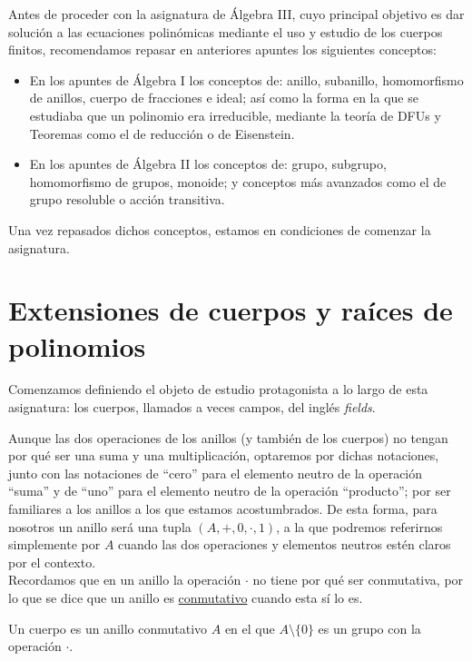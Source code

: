 Antes de proceder con la asignatura de Álgebra III, cuyo principal objetivo es dar solución a las ecuaciones polinómicas mediante el uso y estudio de los cuerpos finitos, recomendamos repasar en anteriores apuntes los siguientes conceptos:
\begin{itemize}
    \item En los apuntes de Álgebra I los conceptos de: anillo, subanillo, homomorfismo de anillos, cuerpo de fracciones e ideal; así como la forma en la que se estudiaba que un polinomio era irreducible, mediante la teoría de DFUs y Teoremas como el de reducción o de Eisenstein.
    \item En los apuntes de Álgebra II los conceptos de: grupo, subgrupo, homomorfismo de grupos, monoide; y conceptos más avanzados como el de grupo resoluble o acción transitiva.
\end{itemize}
Una vez repasados dichos conceptos, estamos en condiciones de comenzar la asignatura.

\chapter{Extensiones de cuerpos y raíces de polinomios}
\noindent
Comenzamos definiendo el objeto de estudio protagonista a lo largo de esta asignatura: los cuerpos, llamados a veces campos, del inglés \textit{fields}.

\begin{notacion}
    Aunque las dos operaciones de los anillos (y también de los cuerpos) no tengan por qué ser una suma y una multiplicación, optaremos por dichas notaciones, junto con las notaciones de ``cero'' para el elemento neutro de la operación ``suma'' y de ``uno'' para el elemento neutro de la operación ``producto''; por ser familiares a los anillos a los que estamos acostumbrados. De esta forma, para nosotros un anillo será una tupla $(A,+,0,\cdot,1)$, a la que podremos referirnos simplemente por $A$ cuando las dos operaciones y elementos neutros estén claros por el contexto.\\

    \noindent
    Recordamos que en un anillo la operación $\cdot $ no tiene por qué ser conmutativa, por lo que se dice que un anillo es \underline{conmutativo} cuando esta sí lo es.
\end{notacion}

\begin{definicion}[Cuerpo]
    Un cuerpo es un anillo conmutativo $A$ en el que $A\setminus \{0\}$ es un grupo con la operación $\cdot $.
\end{definicion}

